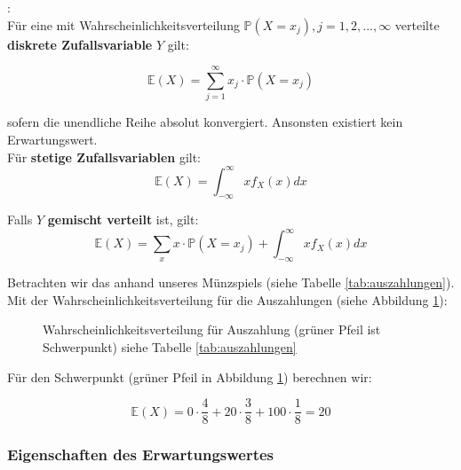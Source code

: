 {    \begin{definition}:\\\label{def:erwartungswert}
        Für eine mit Wahrscheinlichkeitsverteilung ${\mathbb P\left(X=x_{j}\right),j=1,2,...,{\infty}}$ verteilte \textbf{diskrete Zufallsvariable} $Y$ gilt:

        \[\mathbb E\left(X\right)=\sum_{j=1}^{{\infty}}{x_{j}\cdot \mathbb P\left(X=x_{j}\right)}\]

        sofern die unendliche Reihe absolut konvergiert. Ansonsten existiert kein Erwartungswert.\\

        Für \textbf{stetige Zufallsvariablen} gilt:
        \[\mathbb E\left(X\right)=\int_{-{\infty}}^{{\infty}}{xf_{X}\left(x\right)}dx\]

        Falls $Y$ \textbf{gemischt verteilt} ist, gilt:
        \[\mathbb E\left(X\right)=\sum_{x}{x\cdot \mathbb P(X=x_{j})}+\int_{-{\infty}}^{{\infty}}{xf_{X}(x)}dx\]
    \end{definition}

    Betrachten wir das anhand unseres Münzspiels (siehe Tabelle \ref{tab:auszahlungen}).\\

    Mit der Wahrscheinlichkeitsverteilung für die Auszahlungen (siehe Abbildung \ref{fig:vert_muenze}):

    \begin{figure}
    \centering
        \begin{tikzpicture}
            
        \end{tikzpicture}
        \caption{Wahrscheinlichkeitsverteilung für Auszahlung (grüner Pfeil ist Schwerpunkt) siehe Tabelle \ref{tab:auszahlungen}}
        \label{fig:vert_muenze}
    \end{figure}

    Für den Schwerpunkt (grüner Pfeil in Abbildung \ref{fig:vert_muenze}) berechnen wir:

    \[
    \mathbb E\left(X\right)=0\cdot \frac{4}{8}+20\cdot \frac{3}{8}+100\cdot \frac{1}{8}=20
    \]


    \subsubsection{Eigenschaften des Erwartungswertes}

}
